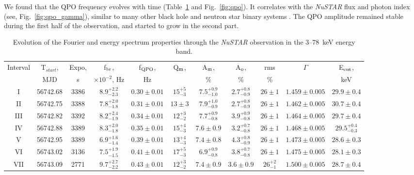 \documentclass[a4paper,fleqn,usenatbib]{mnras}
\begin{document}
We found that the QPO frequency evolves with time (Table~\ref{tab:timing} and Fig.~\ref{fig:qpo}).
It correlates with the {\it NuSTAR} flux and photon index (see, Fig.~\ref{fig:qpo_gamma}), similar to many other black hole and neutron star binary systems \citep[see, e.g.,][]{2000ApJ...531..537S, vignarca03,2003A&A...407.1039P, fuerst16}.
The QPO amplitude remained stable during the first half of the observation, and started to grow in the second part.

\begin{table}
\noindent
\centering
\caption{Evolution of the Fourier and energy spectrum properties through the {\it NuSTAR} observation in the 3--78~keV energy band.}
\label{tab:timing}
\centering
\begin{tabular}{|c|c|c|c|c|c|c|c|c|c|c|}
\hline\hline
Interval    & T$_{start}$,  & Expo,     & f$_{\rm br}$,                     & f$_{\rm QPO}$, & Q$_{\rm m}$,     & A$_{\rm m}$,  & A$_{\rm o}$,      & rms & $\Gamma$ & E$_{\rm cut}$, \\
            &  MJD          &  s        & $\times10^{-2}$, Hz               &  Hz            &   & \%            &  \%               &   \%       &          &  keV             \\
\hline
I           & 56742.68      & 3386      & $8.9_{-2.3}^{+2.2}$  & $0.30\pm0.01$ & $15_{-3}^{+5}$ & $7.5_{-1.0}^{+0.9}$ & $2.7_{-0.9}^{+0.8}$ & $26\pm1$ & $1.459\pm0.005$ & $29.9\pm0.4$ \\
II & 56742.75 & 3388 & $7.8_{-1.8}^{+2.0}$ & $0.31\pm0.01$ & $13\pm3$ & $7.9_{-0.9}^{+1.0}$ & $2.7_{-0.9}^{+0.8}$ & $26\pm1$ & $1.462\pm0.005$ & $30.7\pm0.4$ \\
III & 56742.82 & 3392 & $8.2_{-1.9}^{+2.4}$ & $0.34\pm0.01$ & $12_{-2}^{+3}$ & $7.7_{-0.8}^{+0.9}$ & $3.9_{-0.8}^{+0.9}$ & $26\pm1$ & $1.464\pm0.005$ & $29.7\pm0.4$ \\
IV & 56742.88 & 3389 & $8.3_{-1.8}^{+2.0}$ & $0.35\pm0.01$ & $15_{-3}^{+4}$ & $7.6\pm0.9$ & $3.2_{-0.8}^{+0.7}$ & $26\pm1$ & $1.468\pm0.005$ & $29.5_{-0.3}^{+0.4}$ \\
V & 56742.95 & 3389 & $6.9_{-1.4}^{+1.6}$ & $0.39\pm0.01$ & $13_{-3}^{+4}$ & $7.4\pm0.8$ & $4.3_{-0.9}^{+0.8}$ & $26\pm1$ & $1.473\pm0.005$ & $28.6\pm0.3$ \\
VI & 56743.02 & 3136 & $7.5_{-1.5}^{+1.9}$ & $0.41\pm0.01$ & $17_{-3}^{+5}$ & $6.9_{-0.8}^{+0.9}$ & $3.8_{-0.8}^{+0.7}$ & $26\pm1$ & $1.475\pm0.005$ & $28.1\pm0.3$ \\
VII & 56743.09 & 2771 & $9.7_{-2.2}^{+2.7}$ & $0.43\pm0.01$ & $12_{-2}^{+3}$ & $7.4\pm0.9$ & $3.6\pm0.9$ & $26_{-1}^{+2}$ & $1.500\pm0.005$ & $28.7\pm0.4$ \\

\end{tabular}
\end{table}
\end{document}

